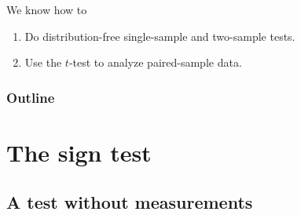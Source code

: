 %
%
%



\subtitle{and the Wilcoxon signed-rank test}

\date{5 November 2013}



\begin{frame}
  \maketitle
\end{frame}


\begin{frame}{We know how to}
  \begin{enumerate}
    \item Do distribution-free single-sample and two-sample tests.
    \item Use the $t$-test to analyze paired-sample data.
  \end{enumerate}
\end{frame}

\begin{frame}\frametitle<presentation>{Outline}
  \tableofcontents
\end{frame}


\section{The sign test}

\subsection{A test without measurements}

